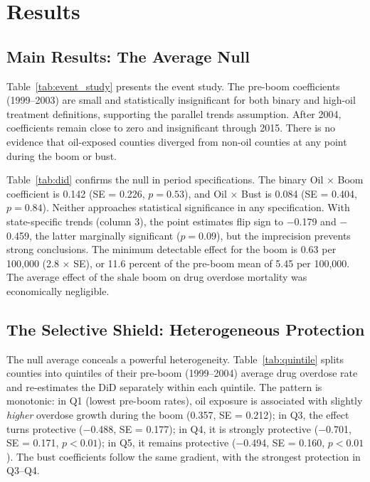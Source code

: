 \documentclass[12pt]{article}
\begin{document}
\section{Results}

\subsection{Main Results: The Average Null}

Table~\ref{tab:event_study} presents the event study. The pre-boom coefficients (1999--2003) are small and statistically insignificant for both binary and high-oil treatment definitions, supporting the parallel trends assumption. After 2004, coefficients remain close to zero and insignificant through 2015. There is no evidence that oil-exposed counties diverged from non-oil counties at any point during the boom or bust.



Table~\ref{tab:did} confirms the null in period specifications. The binary Oil $\times$ Boom coefficient is 0.142 (SE = 0.226, $p = 0.53$), and Oil $\times$ Bust is 0.084 (SE = 0.404, $p = 0.84$). Neither approaches statistical significance in any specification. With state-specific trends (column 3), the point estimates flip sign to $-$0.179 and $-$0.459, the latter marginally significant ($p = 0.09$), but the imprecision prevents strong conclusions. The minimum detectable effect for the boom is 0.63 per 100,000 (2.8 $\times$ SE), or 11.6 percent of the pre-boom mean of 5.45 per 100,000. The average effect of the shale boom on drug overdose mortality was economically negligible.



\subsection{The Selective Shield: Heterogeneous Protection}

The null average conceals a powerful heterogeneity. Table~\ref{tab:quintile} splits counties into quintiles of their pre-boom (1999--2004) average drug overdose rate and re-estimates the DiD separately within each quintile. The pattern is monotonic: in Q1 (lowest pre-boom rates), oil exposure is associated with slightly \textit{higher} overdose growth during the boom (0.357, SE = 0.212); in Q3, the effect turns protective ($-$0.488, SE = 0.177); in Q4, it is strongly protective ($-$0.701, SE = 0.171, $p < 0.01$); in Q5, it remains protective ($-$0.494, SE = 0.160, $p < 0.01$). The bust coefficients follow the same gradient, with the strongest protection in Q3--Q4.
\end{document}
